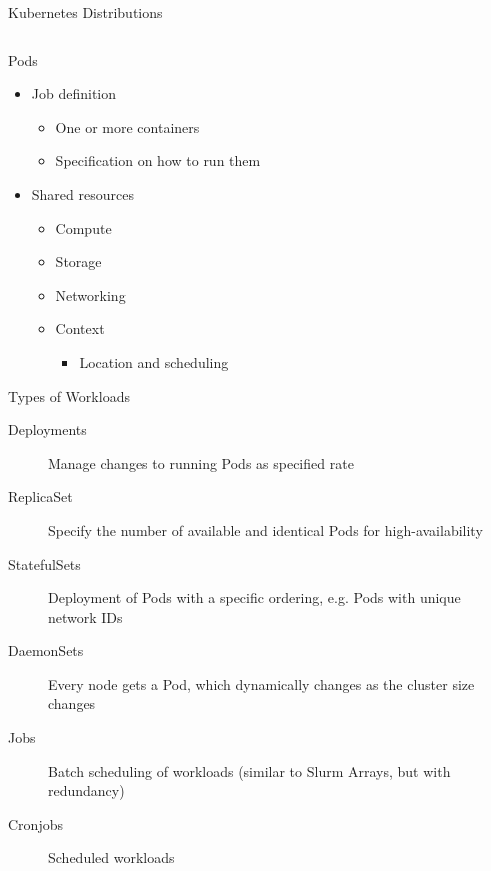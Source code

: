 \begin{frame}{Kubernetes Distributions}
\begin{columns}[c]
\begin{column}{0.5\textwidth}
\end{column}
\end{columns}
\end{frame}

\begin{frame}{Pods}
\begin{itemize}
\item Job definition
\begin{itemize}
\item One or more containers
\item Specification on how to run them
\end{itemize}
\item Shared resources
\begin{itemize}
\item Compute
\item Storage
\item Networking
\item Context
\begin{itemize}
\item Location and scheduling
\end{itemize}
\end{itemize}
\end{itemize}
\end{frame}

\begin{frame}{Types of Workloads}
\begin{description}
\item[Deployments] Manage changes to running Pods as specified rate
\item[ReplicaSet] Specify the number of available and identical Pods for high-availability
\item[StatefulSets] Deployment of Pods with a specific ordering, e.g. Pods with unique network IDs 
\item[DaemonSets] Every node gets a Pod, which dynamically changes as the cluster size changes
\item[Jobs] Batch scheduling of workloads (similar to Slurm Arrays, but with redundancy)
\item[Cronjobs] Scheduled workloads
\end{description}
\end{frame}

